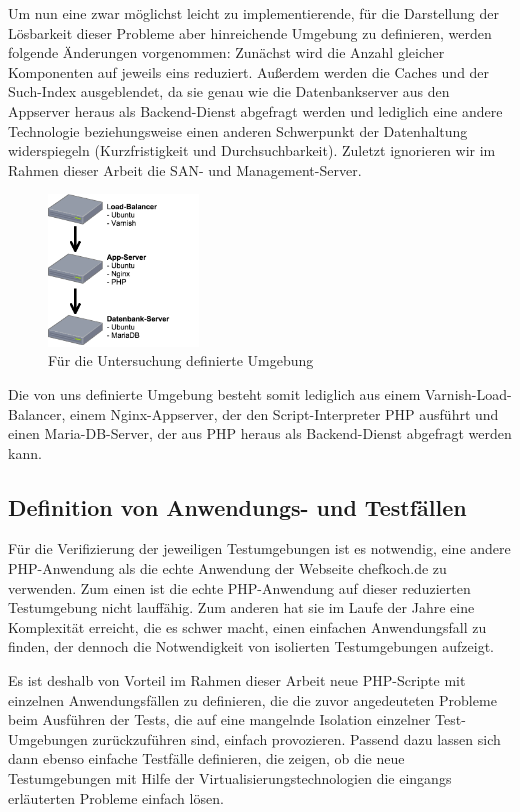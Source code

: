 Um nun eine zwar möglichst leicht zu implementierende, für die Darstellung der Lösbarkeit dieser Probleme aber hinreichende Umgebung zu definieren, werden folgende Änderungen vorgenommen:
Zunächst wird die Anzahl gleicher Komponenten auf jeweils eins reduziert. Außerdem werden die Caches und der Such-Index ausgeblendet, da sie genau wie die Datenbankserver aus den Appserver heraus als Backend-Dienst abgefragt werden und lediglich eine andere Technologie beziehungsweise einen anderen Schwerpunkt der Datenhaltung widerspiegeln (Kurzfristigkeit und Durchsuchbarkeit). Zuletzt ignorieren wir im Rahmen dieser Arbeit die SAN- und Management-Server.

\begin{figure}[!ht]
  \begin{center}
    \includegraphics[width=4cm]{bilder/Untersuchungs-Umgebung.png}
    \caption{Für die Untersuchung definierte Umgebung}
  \end{center}
\end{figure}

Die von uns definierte Umgebung besteht somit lediglich aus einem Varnish-Load-Balancer, einem Nginx-Appserver, der den Script-Interpreter PHP ausführt und einen Maria-DB-Server, der aus PHP heraus als Backend-Dienst abgefragt werden kann.

\subsection{Definition von Anwendungs- und Testfällen}

Für die Verifizierung der jeweiligen Testumgebungen ist es notwendig, eine andere PHP-Anwendung als die echte Anwendung der Webseite chefkoch.de zu verwenden. Zum einen ist die echte PHP-Anwendung auf dieser reduzierten Testumgebung nicht lauffähig. Zum anderen hat sie im Laufe der Jahre eine Komplexität erreicht, die es schwer macht, einen einfachen Anwendungsfall zu finden, der dennoch die Notwendigkeit von isolierten Testumgebungen aufzeigt.

Es ist deshalb von Vorteil im Rahmen dieser Arbeit neue PHP-Scripte mit einzelnen Anwendungsfällen zu definieren, die die zuvor angedeuteten Probleme beim Ausführen der Tests, die auf eine mangelnde Isolation einzelner Test-Umgebungen zurückzuführen sind, einfach provozieren. Passend dazu lassen sich dann ebenso einfache Testfälle definieren, die zeigen, ob die neue Testumgebungen mit Hilfe der Virtualisierungstechnologien die eingangs erläuterten Probleme einfach lösen.

